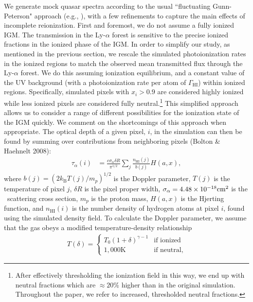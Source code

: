  
We generate mock quasar spectra according to the usual ``fluctuating Gunn-Peterson" approach (e.g., \citealt{Croft:2000hs}), with a few refinements to capture the main effects of incomplete reionization. First and foremost, we do not assume a fully ionized IGM. The transmission in the Ly-$\alpha$ forest is sensitive to the precise ionized fractions in the ionized phase of the IGM. In order to simplify our study, as mentioned in the previous section, we rescale the simulated photoionization rates in the ionized regions to match the observed mean transmitted flux through the Ly-$\alpha$ forest. We do this assuming
ionization equilibrium, and a constant value of the UV background (with a photoionization rate per atom of $\Gamma_{\text{HI}}$) within ionized regions. Specifically, simulated pixels with $x_i > 0.9$ are considered highly ionized while less ionized pixels are considered fully neutral.\footnote{After effectively thresholding the ionization field in this way, we end up with neutral fractions which are $\approx 20\%$ higher than in the original simulation. Throughout the paper, we refer to increased, thresholded neutral fractions.} This simplified approach allows us to consider a range of different possibilities for
the ionization state of the IGM quickly. We comment on the shortcomings of this approach when appropriate.
The optical depth of a given pixel, $i$, in the simulation can then be found by summing over contributions from neighboring pixels (Bolton \& Haehnelt 2008):
\begin{align}
\tau_{\alpha}(i) &= \frac{c \sigma_{\alpha}\delta R}{\pi^{1/2}}\sum_j \frac{n_{\text{HI}}(j)}{b(j)}H(a,x),
\end{align}
where $b(j) = (2 k_{\text{B}}T(j)/m_{p})^{1/2}$ is the Doppler parameter, $T(j)$ is the temperature of pixel $j$, $\delta R$ is the pixel proper width, $\sigma_\alpha = 4.48 \times 10^{-18}\text{cm}^{2}$ is the \lya\ scattering cross section, $m_p$ is the proton mass, $H(a,x)$ is the Hjerting function, and $n_{\text{HI}}(i)$ is the number density of hydrogen atoms at pixel $i$, found using the simulated density field. To calculate the Doppler parameter, we assume that the gas obeys a modified temperature-density relationship
\begin{align}
T(\delta) = \begin{cases} T_0(1 + \delta)^{\gamma - 1} &\mbox{if ionized}\\
1,000 \text{K} &\mbox{if neutral}, \end{cases} \label{eq:TDrelation}
\end{align}
